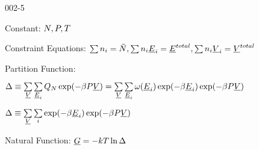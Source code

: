 \begin{mitframe}{002-5} %

    
\begin{listone}
    
    \item Constant: $\nummoles, \p, \Temp$

    \item Constraint Equations: $\sum\nolimits \molspecies{i} = \totmoles, \sum\nolimits \molspecies{i}\uline{\energy}_{i} = \uline{\energy}^{total},\sum\nolimits \molspecies{i}\uline{\vol}_{i} = \uline{\vol}^{total}  $     %
    
    \item Partition Function:
    
    \begin{listtwo}
    
    	\item $\iipf \equiv \sum\limits_{\uline{\vol}}\sum\limits_{\uline{\energy}_{i}} \cpf\exp(-\boltznorm\p\uline{\vol}) = \sum\limits_{\uline{\vol}}\sum\limits_{\uline{\energy}_{i}} \mpf(\uline{\energy}_{i})\exp(-\boltznorm\uline{\energy}_{i})\exp(-\boltznorm\p\uline{\vol}) $
    
    	\item $\iipf \equiv \sum\limits_{\uline{\vol}}\sum\limits_{i} \exp(-\boltznorm\uline{\energy}_{i})\exp(-\boltznorm\p\uline{\vol}) $
    
    \end{listtwo}
        
    \item Natural Function: $\uline{\gibbs} = -\thermcond\Temp\ln\iipf$
    
    
\end{listone}
    
\end{mitframe}